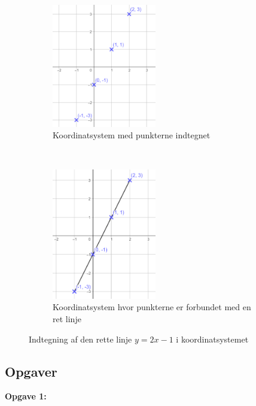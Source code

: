 \begin{figure}[ht]
    \centering
    \begin{subfigure}[t]{0.5\textwidth}
        \centering
        \includegraphics[width=0.5\textwidth]{img_1}
        \caption{Koordinatsystem med punkterne indtegnet}
    \end{subfigure}%
    ~ 
    \begin{subfigure}[t]{0.5\textwidth}
        \centering
        \includegraphics[width=0.5\textwidth]{img_2}
        \caption{Koordinatsystem hvor punkterne er forbundet med en ret linje}
    \end{subfigure}
    \caption{Indtegning af den rette linje $y = 2x - 1$ i koordinatsystemet}
\end{figure}


\subsection*{Opgaver}


\textbf{Opgave 1:}

